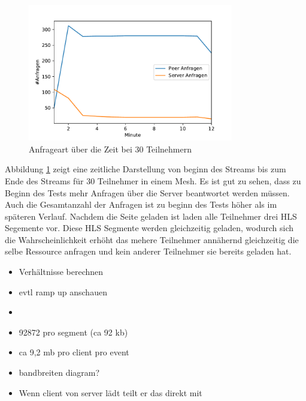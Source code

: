 \begin{figure}[!h]
	\centering
	\includegraphics[width=0.8\textwidth]{figures/peer_vs_server_over_time}
	\caption[A Figure Short-Title]{Anfrageart über die Zeit bei 30 Teilnehmern}
	\label{fig:peer_vs_server_over_time}
\end{figure}

Abbildung \ref{fig:peer_vs_server_over_time} zeigt eine zeitliche Darstellung von beginn des Streams bis zum Ende des Streams für 30 Teilnehmer in einem Mesh. Es ist gut zu sehen, dass zu Beginn des Tests mehr Anfragen über die Server beantwortet werden müssen. Auch die Gesamtanzahl der Anfragen ist zu beginn des Tests höher als im späteren Verlauf. Nachdem die Seite geladen ist laden alle Teilnehmer drei HLS Segemente vor. Diese HLS Segmente werden gleichzeitig geladen, wodurch sich die Wahrscheinlichkeit erhöht das mehere Teilnehmer annähernd gleichzeitig die selbe Ressource anfragen und kein anderer Teilnehmer sie bereits geladen hat. 




\begin{itemize}
	\item Verhältnisse berechnen
	\item evtl ramp up anschauen
	\item  
\end{itemize}

\begin{itemize}
	\item 92872 pro segment (ca 92 kb) 
	\item ca 9,2 mb pro client pro event
	\item bandbreiten diagram? 
	\item Wenn client von server lädt teilt er das direkt mit
\end{itemize}

